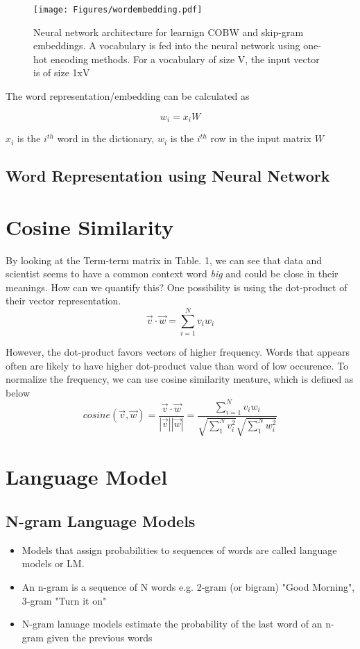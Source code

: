 \documentclass[12pt, oneside]{article}
\begin{document}
\begin{figure}
\center
\texttt{[image: Figures/wordembedding.pdf]}
\caption{Neural network architecture for learnign COBW and skip-gram embeddings. A vocabulary is fed into the neural network using one-hot encoding methods. For a vocabulary of size V, the input vector is of size 1xV
 }
\end{figure}

The word representation/embedding can be calculated as 

$${w_i=x_iW}$$

${x_i}$ is the ${i^{th}}$ word in the dictionary, ${w_i}$ is the ${i^{th}}$ row in the input matrix ${W}$



\subsection{Word Representation using Neural Network}

\section{Cosine Similarity}

By looking at the Term-term matrix in Table. 1, we can see that data and scientist seems to have a common context word \textit{big} and could be close in their meanings. How can we quantify this? One possibility is using the dot-product of their vector representation.
$$
\vec{v}\cdot\vec{w}=\sum_{i=1}^N v_i w_i
$$

However, the dot-product favors vectors of higher frequency. Words that appears often are likely to have higher dot-product value than word of low occurence. To normalize the frequency, we can use cosine similarity meature, which is defined as below 
$$
cosine(\vec{v}, \vec{w})=\frac{\vec{v}\cdot\vec{w}}{|\vec{v}||\vec{w}|}=\frac{\sum_{i=1}^N v_i w_i}{\sqrt{\sum_1^N v_i^2}\sqrt{\sum_1^N w_i^2}}
$$




\section{Language Model}

\subsection{N-gram Language Models}
\begin{itemize}
\item Models that assign probabilities to sequences of words are called language models or LM.
\item An n-gram is a sequence of N words e.g. 2-gram (or bigram) "Good Morning", 3-gram "Turn it on"
\item N-gram lanuage models estimate the probability of the last word of an n-gram given the previous words
\end{itemize}
\end{document}
